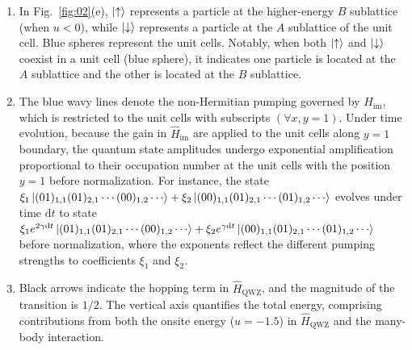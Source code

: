\documentclass[longbibliography, aps, prx, amsmath, amssymb, amsfonts, twocolumn,superscriptaddress, footinbib]{revtex4-1}
\begin{document}
	\begin{enumerate}
		\item In Fig.~\ref{fig:02}(e), $\ket{\uparrow}$ represents a particle at the higher-energy $B$ sublattice (when $u<0$), while $\ket{\downarrow}$ represents a particle at the $A$ sublattice of the unit cell. 
		Blue spheres represent the unit cells. 
		Notably, when both $\ket{\uparrow}$ and $\ket{\downarrow}$ coexist in a unit cell (blue sphere), it indicates one particle is located at the $A$ sublattice and the other is located at the $B$ sublattice. 
		\item The blue wavy lines denote the non-Hermitian pumping governed by $\hat{H}_{\text{im}}$, which is restricted to the unit cells with subscripts $(\forall x,y=1)$. Under time evolution, because the gain in $\hat{H}_{\text{im}}$ are applied to the unit cells along $y=1$ boundary, the quantum state amplitudes undergo exponential amplification proportional to their occupation number at the unit cells with the position $y=1$ before normalization. For instance, the state $\xi_1 \ket{(01)_{1,1}(01)_{2,1}\cdots(00)_{1,2}\cdots} + \xi_2\ket{(00)_{1,1}(01)_{2,1}\cdots(01)_{1,2}\cdots}$ evolves under time $\mathrm{d}t$ to state $\xi_1 e^{2\gamma \mathrm{d}t} \ket{(01)_{1,1}(01)_{2,1}\cdots(00)_{1,2}\cdots} + \xi_2 e^{\gamma \mathrm{d}t} \ket{(00)_{1,1}(01)_{2,1}\cdots(01)_{1,2}\cdots}$ before normalization, where the exponents reflect the different pumping strengths to coefficients $\xi_1$ and $\xi_2$. 
		\item Black arrows indicate the hopping term in $\hat{H}_{\text{QWZ}}$, and the magnitude of the transition is $1/2$. The vertical axis quantifies the total energy, comprising contributions from both the onsite energy ($u=-1.5$) in $\hat{H}_{\text{QWZ}}$ and the many-body interaction.
	\end{enumerate}
\end{document}

